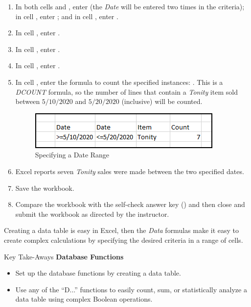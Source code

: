\begin{enumbox}
	\begin{enumerate}
		\item In both cells  and , enter  (the \textit{Date} will be entered two times in the criteria); in cell , enter ; and in cell , enter .
		\item In cell , enter .
		\item In cell , enter .
		\item In cell , enter .
		\item In cell , enter the formula to count the specified instances: . This is a \textit{DCOUNT} formula, so the number of lines that contain a \textit{Tonity} item sold between $ 5/10/2020 $ and $ 5/20/2020 $ (inclusive) will be counted.
		
		\begin{figure}[H]
			\centering
			\includegraphics[width=\maxwidth{.95\linewidth}]{gfx/ch09_fig24}
			\caption{Specifying a Date Range}
			\label{09:fig24}
		\end{figure}
	
		\item Excel reports seven \textit{Tonity} sales were made between the two specified dates.
		\item Save the  workbook.
		\item Compare the workbook with the self-check answer key () and then close and submit the  workbook as directed by the instructor.	
	\end{enumerate}
\end{enumbox}

Creating a data table is easy in Excel, then the \textit{Data} formulas make it easy to create complex calculations by specifying the desired criteria in a range of cells.
	
\begin{center}
	\begin{tkwbox}{Key Take-Aways}
		\textbf{Database Functions}
		\\
		\begin{itemize}
			\setlength{\itemsep}{0pt}
			\setlength{\parskip}{0pt}
			\setlength{\parsep}{0pt}
			
			\item Set up the database functions by creating a data table.
			\item Use any of the ``D...'' functions to easily count, sum, or statistically analyze a data table using complex Boolean operations. 
			
		\end{itemize}
	\end{tkwbox}
\end{center}

